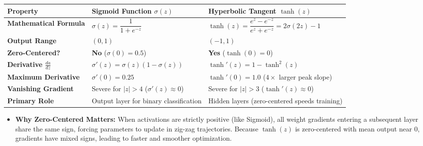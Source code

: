 \documentclass[10pt,a4paper]{article}
\begin{document}
\begin{center}
\small
\begin{tabular}{>{\raggedright\arraybackslash}p{}>{\raggedright\arraybackslash}p{}>{\raggedright\arraybackslash}p{}}
\toprule
\rowcolor{lightbg}
\textbf{Property} & \textbf{Sigmoid Function $\sigma(z)$} & \textbf{Hyperbolic Tangent $\tanh(z)$} \\
\midrule
\textbf{Mathematical Formula} & $\sigma(z) = \dfrac{1}{1 + e^{-z}}$ & $\tanh(z) = \dfrac{e^z - e^{-z}}{e^z + e^{-z}} = 2\sigma(2z) - 1$ \\
\addlinespace[2pt]
\textbf{Output Range} & $(0, 1)$ & $(-1, 1)$ \\
\addlinespace[2pt]
\textbf{Zero-Centered?} & \textbf{No} ($\sigma(0) = 0.5$) & \textbf{Yes} ($\tanh(0) = 0$) \\
\addlinespace[2pt]
\textbf{Derivative $\frac{da}{dz}$} & $\sigma'(z) = \sigma(z)(1 - \sigma(z))$ & $\tanh'(z) = 1 - \tanh^2(z)$ \\
\addlinespace[2pt]
\textbf{Maximum Derivative} & $\sigma'(0) = 0.25$ & $\tanh'(0) = \mathbf{1.0}$ ($4\times$ larger peak slope) \\
\addlinespace[2pt]
\textbf{Vanishing Gradient} & Severe for $|z| > 4$ ($\sigma'(z) \approx 0$) & Severe for $|z| > 3$ ($\tanh'(z) \approx 0$) \\
\addlinespace[2pt]
\textbf{Primary Role} & Output layer for binary classification & Hidden layers (zero-centered speeds training) \\
\bottomrule
\end{tabular}
\end{center}

\vspace{1pt}
\begin{itemize}[leftmargin=12pt, itemsep=1pt]
    \item \textbf{Why Zero-Centered Matters:} When activations are strictly positive (like Sigmoid), all weight gradients entering a subsequent layer share the same sign, forcing parameters to update in zig-zag trajectories. Because $\tanh(z)$ is zero-centered with mean output near 0, gradients have mixed signs, leading to faster and smoother optimization.
\end{itemize}

\newpage
\end{document}
